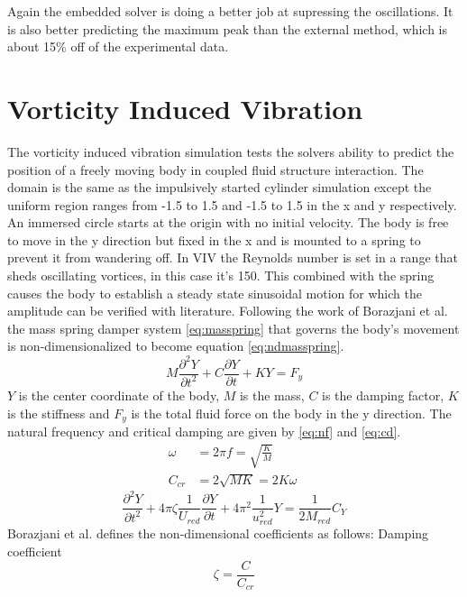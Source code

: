 Again the embedded solver is doing a better job at supressing the oscillations. It is also better predicting the maximum peak than the external method, which is about 15\% off of the experimental data.

\section{Vorticity Induced Vibration}
The vorticity induced vibration simulation tests the solvers ability to predict the position of a freely moving body in coupled fluid structure interaction.
The domain is the same as the impulsively started cylinder simulation except the uniform region ranges from -1.5 to 1.5 and -1.5 to 1.5 in the x and y respectively.
An immersed circle starts at the origin with no initial velocity. 
The body is free to move in the y direction but fixed in the x and is mounted to a spring to prevent it from wandering off. 
In VIV the Reynolds number is set in a range that sheds oscillating vortices, in this case it's 150. 
This combined with the spring causes the body to establish a steady state sinusoidal motion for which the amplitude can be verified with literature.
Following the work of Borazjani et al\cite{borazjani2008curvilinear}. the mass spring damper system \eqref{eq:masspring} that governs the body's movement is non-dimensionalized to become equation \eqref{eq:ndmasspring}. 
\begin{equation}
M\frac{\partial^2Y}{\partial t^2}+C\frac{\partial Y}{\partial t}+KY=F_y \label{eq:masspring}
\end{equation}
$Y$ is the center coordinate of the body, $M$ is the mass, $C$ is the damping factor, $K$ is the stiffness and $F_y$ is the total fluid force on the body in the y direction. 
The natural frequency and critical damping are given by \eqref{eq:nf} and \eqref{eq:cd}. 
\begin{align}
\omega &=2\pi f =\sqrt{\frac{K}{M}}\label{eq:nf}\\
C_{cr}&=2\sqrt{MK}=2K\omega \; \label{eq:cd}
\end{align}
\begin{equation}
\frac{\partial^2 Y}{\partial t^2}+4\pi \zeta\frac{1}{U_{red}}\frac{\partial Y}{\partial t}+4\pi^2\frac{1}{u_{red}^2}Y=\frac{1}{2M_{red}}C_Y\label{eq:ndmasspring}
\end{equation}
Borazjani et al. defines the non-dimensional coefficients as follows:\newline
Damping coefficient
\begin{equation}
\zeta=\frac{C}{C_{cr}}\label{eq:damping coefficient}
\end{equation}
